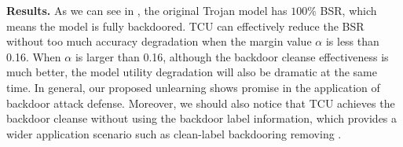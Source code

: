 \noindent
\textbf{Results.} As we can see in , the original Trojan model has $100\%$ BSR, which means the model is fully backdoored. TCU can effectively reduce the BSR without too much accuracy degradation when the margin value $\alpha$ is less than 0.16. When $\alpha$ is larger than 0.16, although the backdoor cleanse effectiveness is much better, the model utility degradation will also be dramatic at the same time. In general, our proposed unlearning shows promise in the application of backdoor attack defense. Moreover, we should also notice that TCU achieves the backdoor cleanse without using the backdoor label information, which provides a wider application scenario such as clean-label backdooring removing \citep{zeng2023narcissus}.

\fi